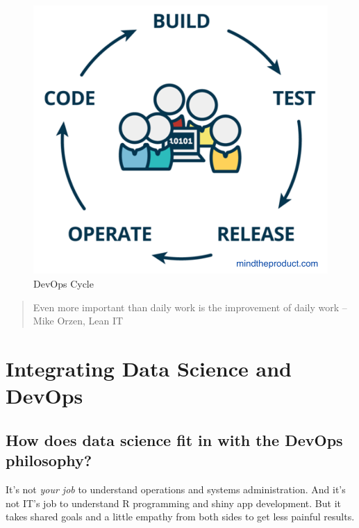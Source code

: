 \documentclass[]{book}
\theoremstyle{definition}
\theoremstyle{definition}
\theoremstyle{definition}
\theoremstyle{remark}
\begin{document}
\begin{figure}
\centering
\includegraphics{imgs/devops/code-devops.png}
\caption{DevOps Cycle}
\end{figure}

\begin{quote}
Even more important than daily work is the improvement of daily work
--Mike Orzen, Lean IT
\end{quote}

\hypertarget{integrating-data-science-and-devops}{%
\section{Integrating Data Science and
DevOps}\label{integrating-data-science-and-devops}}

\hypertarget{how-does-data-science-fit-in-with-the-devops-philosophy}{%
\subsection{How does data science fit in with the DevOps
philosophy?}\label{how-does-data-science-fit-in-with-the-devops-philosophy}}

It's not \emph{your job} to understand operations and systems
administration. And it's not IT's job to understand R programming and
shiny app development. But it takes shared goals and a little empathy
from both sides to get less painful results.
\end{document}
